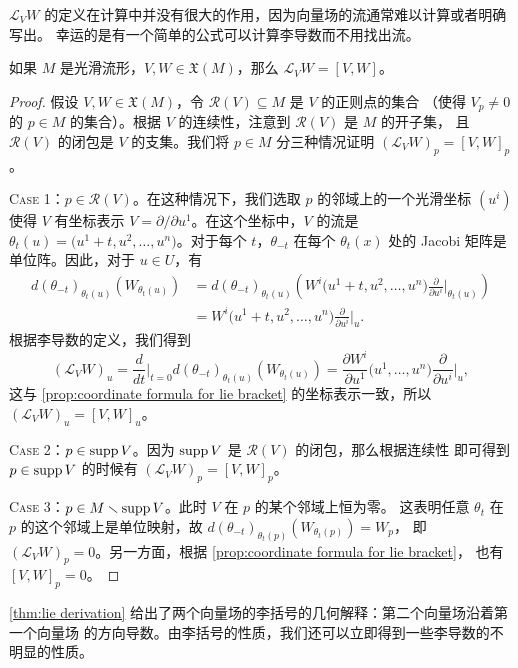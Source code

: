 $\mathcal L_VW$ 的定义在计算中并没有很大的作用，因为向量场的流通常难以计算或者明确写出。
幸运的是有一个简单的公式可以计算李导数而不用找出流。

\begin{theorem}\label{thm:lie derivation}
  如果 $M$ 是光滑流形，$V,W\in\mathfrak X(M)$，那么 $\mathcal L_VW=[V,W]$。
\end{theorem}
\begin{proof}
  假设 $V,W\in\mathfrak X(M)$，令 $\mathcal R(V)\subseteq M$ 是 $V$ 的正则点的集合
  （使得 $V_p\neq 0$ 的 $p\in M$ 的集合）。根据 $V$ 的连续性，注意到 $\mathcal R(V)$ 是 $M$ 的开子集，
  且 $\mathcal R(V)$ 的闭包是 $V$ 的支集。我们将 $p\in M$ 分三种情况证明 $(\mathcal L_VW)_p=[V,W]_p$。
  
  \textsc{Case 1}：$p\in\mathcal R(V)$。在这种情况下，我们选取 $p$ 的邻域上的一个光滑坐标
  $(u^i)$ 使得 $V$ 有坐标表示 $V=\partial/\partial u^1$。在这个坐标中，$V$ 的流是
  $\theta_t(u)=\bigl(u^1+t,u^2,\dots,u^n\bigr)$。对于每个 $t$，$\theta_{-t}$ 在每个
  $\theta_t(x)$ 处的 Jacobi 矩阵是单位阵。因此，对于 $u\in U$，有
  \begin{align*}
    d(\theta_{-t})_{\theta_t(u)}(W_{\theta_t(u)})&=
    d(\theta_{-t})_{\theta_t(u)}\left(
      W^i\bigl(u^1+t,u^2,\dots,u^n\bigr)\frac{\partial}{\partial u^i}\bigg|_{\theta_t(u)}
    \right)\\
    &=W^i\bigl(u^1+t,u^2,\dots,u^n\bigr)\frac{\partial}{\partial u^i}\bigg|_{u}.
  \end{align*}
  根据李导数的定义，我们得到
  \[
    (\mathcal L_VW)_u=\frac{d}{dt}\bigg|_{t=0}d(\theta_{-t})_{\theta_t(u)}(W_{\theta_t(u)})
    =\frac{\partial W^i}{\partial u^1}\bigl(u^1,\dots,u^n\bigr)\frac{\partial}{\partial u^i}\bigg|_{u},
  \]
  这与 \autoref{prop:coordinate formula for lie bracket} 的坐标表示一致，所以
  $(\mathcal L_VW)_u=[V,W]_u$。

  \textsc{Case 2}：$p\in\operatorname{supp} V$。因为 $\operatorname{supp} V$ 是 $\mathcal R(V)$ 的闭包，那么根据连续性
  即可得到 $p\in\operatorname{supp} V$ 的时候有 $(\mathcal L_VW)_p=[V,W]_p$。

  \textsc{Case 3}：$p\in M\smallsetminus \operatorname{supp} V$。此时 $V$ 在 $p$ 的某个邻域上恒为零。
  这表明任意 $\theta_t$ 在 $p$ 的这个邻域上是单位映射，故 $d(\theta_{-t})_{\theta_t(p)}(W_{\theta_t(p)})=W_p$，
  即 $(\mathcal L_VW)_p=0$。另一方面，根据 \autoref{prop:coordinate formula for lie bracket}，
  也有 $[V,W]_p=0$。
\end{proof}

\autoref{thm:lie derivation} 给出了两个向量场的李括号的几何解释：第二个向量场沿着第一个向量场
的方向导数。由李括号的性质，我们还可以立即得到一些李导数的不明显的性质。

